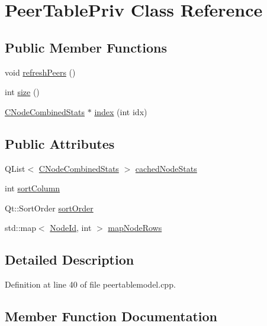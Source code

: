 \hypertarget{class_peer_table_priv}{}\section{Peer\+Table\+Priv Class Reference}
\label{class_peer_table_priv}
\subsection*{Public Member Functions}
\begin{DoxyCompactItemize}
\item 
void \hyperlink{class_peer_table_priv_a304d99874f6cd0c67ed207546a5ca904}{refresh\+Peers} ()
\item 
int \hyperlink{class_peer_table_priv_abc703185b3067489b0d5ad22c2147112}{size} ()
\item 
\hyperlink{struct_c_node_combined_stats}{C\+Node\+Combined\+Stats} $\ast$ \hyperlink{class_peer_table_priv_a58c817cce967ddd5ae4bad622bfaecb4}{index} (int idx)
\end{DoxyCompactItemize}
\subsection*{Public Attributes}
\begin{DoxyCompactItemize}
\item 
Q\+List$<$ \hyperlink{struct_c_node_combined_stats}{C\+Node\+Combined\+Stats} $>$ \hyperlink{class_peer_table_priv_a8da9d0256d11f205dfa1cdce86843761}{cached\+Node\+Stats}
\item 
int \hyperlink{class_peer_table_priv_a4917597853d2d5f0055be017b8ab33c5}{sort\+Column}
\item 
Qt\+::\+Sort\+Order \hyperlink{class_peer_table_priv_adb95d4bbc4fb13a21a360108aeca5c32}{sort\+Order}
\item 
std\+::map$<$ \hyperlink{net_8h_a954d746a58632565552615fd0a4ee660}{Node\+Id}, int $>$ \hyperlink{class_peer_table_priv_ae27db14bcbe769f494c4db56ef27fb08}{map\+Node\+Rows}
\end{DoxyCompactItemize}


\subsection{Detailed Description}


Definition at line 40 of file peertablemodel.\+cpp.



\subsection{Member Function Documentation}
\hypertarget{class_peer_table_priv_a58c817cce967ddd5ae4bad622bfaecb4}{}

